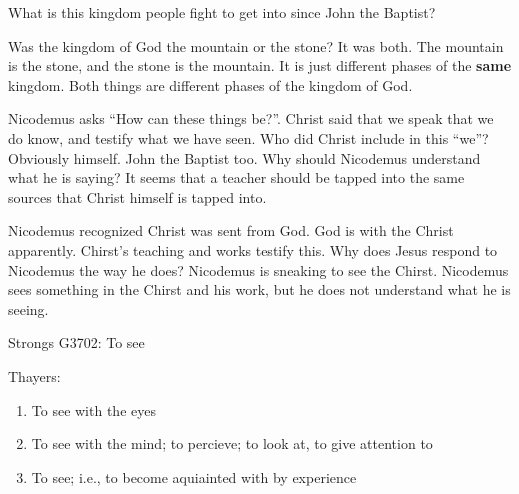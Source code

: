\documentclass[12pt]{article}
\begin{document}
	\begin{quote}
		\BibleMatthewElevenTwelve{}
	\end{quote}

	\begin{quote}
		\BibleLukeSixteenSixteen{}
	\end{quote}

	What is this kingdom people fight to get into since John the
	Baptist?

	\begin{quote}
		\BibleDanielTwoThirtyFive{}
	\end{quote}

	Was the kingdom of God the mountain or the stone? It was both.
	The mountain is the stone, and the stone is the mountain. It
	is just different phases of the \textbf{same} kingdom. Both things
	are different phases of the kingdom of God.

	\begin{quote}
		\BibleJohnThreeOne{}
		\BibleJohnThreeTwo{}
		\BibleJohnThreeThree{}
		\BibleJohnThreeFour{}
		\BibleJohnThreeFive{}
		\BibleJohnThreeSix{}
		\BibleJohnThreeSeven{}
		\BibleJohnThreeEight{}
		\BibleJohnThreeNine{}
		\BibleJohnThreeTen{}
		\BibleJohnThreeEleven{}
		\BibleJohnThreeTwelve{}
	\end{quote}

	Nicodemus asks ``How can these things be?''. Christ said that
	we speak that we do know, and testify what we have seen. Who
	did Christ include in this ``we''? Obviously himself. John the
	Baptist too. Why should Nicodemus understand what he is saying?
	It seems that a teacher should be tapped into the same sources
	that Christ himself is tapped into.

	\begin{quote}
		\BibleJohnThreeTwo{}
		\BibleJohnThreeThree{}
	\end{quote}

	Nicodemus recognized Christ was sent from God. God is with the
	Christ apparently. Chirst's teaching and works testify this.
	Why does Jesus respond to Nicodemus the way he does? Nicodemus
	is sneaking to see the Chirst. Nicodemus sees something in the
	Chirst and his work, but he does not understand what he is 
	seeing.

	\vspace{5mm}
	Strongs G3702: To see

	Thayers:
	\begin{enumerate}
		\item To see with the eyes
		\item To see with the mind; to percieve; to look at,
			to give attention to
		\item To see; i.e., to become aquiainted with by
			experience
	\end{enumerate}
\end{document}
